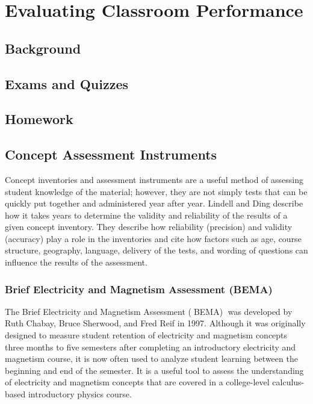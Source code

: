 \chapter[Chapter 4: Evaluating Classroom Performance]{Evaluating Classroom Performance}

\section{Background}

\section{Exams and Quizzes}

\section{Homework}

\section{Concept Assessment Instruments}

Concept inventories and assessment instruments are a useful method of assessing student knowledge of the material; however, they are not simply tests that can be quickly put together and administered year after year. Lindell and Ding describe how it takes years to determine the validity and reliability of the results of a given concept inventory. They describe how reliability (precision) and validity (accuracy) play a role in the inventories and cite how factors such as age, course structure, geography, language, delivery of the tests, and wording of questions can influence the results of the assessment\cite{lindell2012}.

\subsection{Brief Electricity and Magnetism Assessment (BEMA)}

The Brief Electricity and Magnetism Assessment (􏰃BEMA)􏰄 was developed by Ruth Chabay, Bruce Sherwood, and Fred Reif in 1997. Although it was originally designed to measure student retention of electricity and magnetism concepts three months to five semesters after completing an introductory electricity and magnetism course, it is now often used to analyze student learning between the beginning and end of the semester. It is a useful tool to assess the understanding of electricity and magnetism concepts that are covered in a college-level calculus-based introductory physics course\cite{ding2006}.

